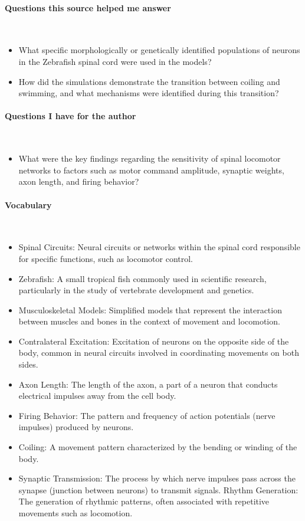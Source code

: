 \paragraph{Questions this source helped me answer} \

\begin{itemize}
    \item What specific morphologically or genetically identified populations of neurons in the Zebrafish spinal cord were used in the models?
    \item How did the simulations demonstrate the transition between coiling and swimming, and what mechanisms were identified during this transition?    
\end{itemize}

\vspace*{-0.5cm}
\paragraph{Questions I have for the author} \ 

\begin{itemize}
    \item What were the key findings regarding the sensitivity of spinal locomotor networks to factors such as motor command amplitude, synaptic weights, axon length, and firing behavior?
\end{itemize}

\vspace{-0.5cm}
\paragraph{Vocabulary} \ 

\begin{itemize}
\item Spinal Circuits: Neural circuits or networks within the spinal cord responsible for specific functions, such as locomotor control.
\item Zebrafish: A small tropical fish commonly used in scientific research, particularly in the study of vertebrate development and genetics.
\item Musculoskeletal Models: Simplified models that represent the interaction between muscles and bones in the context of movement and locomotion.
\item Contralateral Excitation: Excitation of neurons on the opposite side of the body, common in neural circuits involved in coordinating movements on both sides.
\item Axon Length: The length of the axon, a part of a neuron that conducts electrical impulses away from the cell body.
\item Firing Behavior: The pattern and frequency of action potentials (nerve impulses) produced by neurons.
\item Coiling: A movement pattern characterized by the bending or winding of the body.
\item Synaptic Transmission: The process by which nerve impulses pass across the synapse (junction between neurons) to transmit signals.
Rhythm Generation: The generation of rhythmic patterns, often associated with repetitive movements such as locomotion.
\end{itemize}

